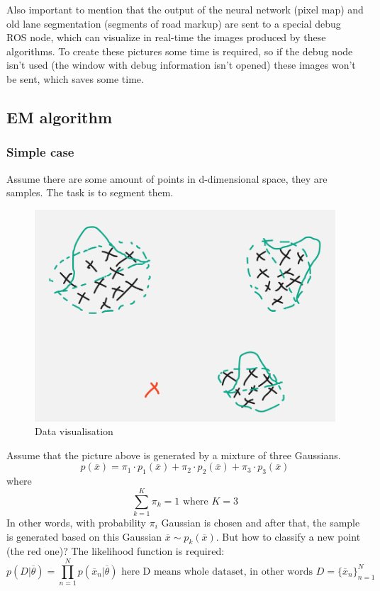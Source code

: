 Also important to mention that the output of the neural network (pixel map) and old lane segmentation (segments of road markup) are sent to a special debug ROS node, which can 
visualize in real-time the images produced by these algorithms. To create these pictures some time is required, so if the debug node isn't used 
(the window with debug information isn't opened) these images won't be sent, which saves some time.
\subsection{EM algorithm}
\subsubsection{Simple case}
Assume there are some amount of points in d-dimensional space, they are samples. The task is to segment them.
\begin{figure}[ht]
    \includegraphics[scale=0.5]{src/Design/assets/em_picture.png}
    \caption{Data visualisation}
\end{figure}
Assume that the picture above is generated by a mixture of three Gaussians.
\[p(\overline{x}) = \pi_1\cdot p_1(\overline{x}) + \pi_2\cdot p_2(\overline{x}) + \pi_3\cdot p_3(\overline{x}) \]
where
\[\sum\limits_{k=1}^{K} \pi_k = 1 \text{ where } K=3\]
In other words, with probability $\pi_i$ Gaussian is chosen and after that, the sample is generated based on this Gaussian 
$\overline{x} \sim p_k(\overline{x})$.
But how to classify a new point (the red one)?
The likelihood function is required:
\[p(D|\overline{\theta}) = \prod\limits_{n=1}^N p(\overline{x}_n | \overline{\theta}) \text{ here D means whole dataset, in other words } D = \{\overline{x}_n \} _{n=1}^N\]
